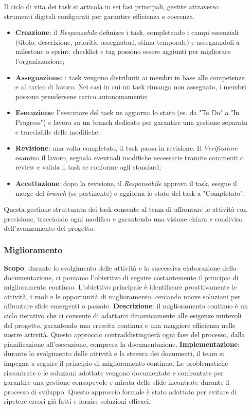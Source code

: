 Il ciclo di vita dei task si articola in sei fasi principali, gestite attraverso strumenti digitali configurati per garantire efficienza e coerenza.
\begin{itemize}
    \item \textbf{Creazione}: il \emph{Responsabile} definisce i task, completando i campi essenziali (titolo, descrizione, priorità, assegnatari, stima temporale) e assegnandoli a milestone o sprint; checklist e tag possono essere aggiunti per migliorare l’organizzazione;
    \item \textbf{Assegnazione}: i task vengono distribuiti ai membri in base alle competenze e al carico di lavoro. Nei casi in cui un task rimanga non assegnato, i membri possono prendersene carico autonomamente;
    \item \textbf{Esecuzione}: l’esecutore del task ne aggiorna lo stato (es. da "To Do" a "In Progress") e lavora su un branch dedicato per garantire una gestione separata e tracciabile delle modifiche;
    \item \textbf{Revisione}: una volta completato, il task passa in revisione. Il \emph{Verificatore} esamina il lavoro, segnala eventuali modifiche necessarie tramite commenti o review e valida il task se conforme agli standard;
    \item \textbf{Accettazione}: dopo la revisione, il \emph{Responsabile} approva il task, esegue il merge del \emph{branch} (se pertinente) e aggiorna lo stato del task a "Completato".
\end{itemize}    
Questa gestione strutturata dei task consente al team di affrontare le attività con precisione, tracciando ogni modifica e garantendo una visione chiara e condivisa dell’avanzamento del progetto.

\subsubsection{Miglioramento}
\textbf{Scopo}: durante lo svolgimento delle attività e la successiva elaborazione della documentazione, ci poniamo l'obiettivo di seguire costantemente il principio di miglioramento continuo. 
L'obiettivo principale è identificare proattivamente le attività, i ruoli e le opportunità di miglioramento, cercando nuove soluzioni per affrontare sfide emergenti o passate.
\textbf{Descrizione}: il miglioramento continuo è un ciclo iterativo che ci consente di adattarci dinamicamente alle esigenze mutevoli del progetto, 
garantendo una crescita continua e una maggiore efficienza nelle nostre attività. 
Questo approccio contraddistinguerà ogni fase del processo, dalla pianificazione all'esecuzione, compresa la documentazione.
\textbf{Implementazione}: durante lo svolgimento delle attività e la stesura dei documenti, il team si impegna a seguire il principio di miglioramento continuo. 
Le problematiche riscontrate e le soluzioni adottate vengono documentate e confrontate per garantire una gestione consapevole e mirata delle sfide incontrate durante il processo di sviluppo. 
Questo approccio formale è stato adottato per evitare di ripetere errori già fatti e fornire soluzioni efficaci.

